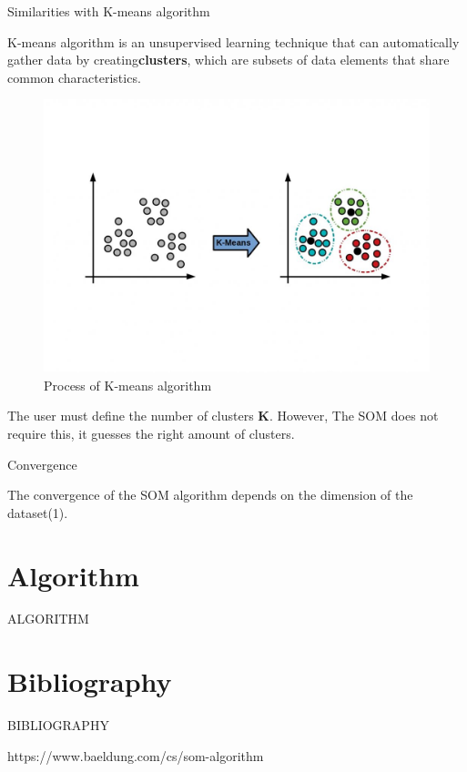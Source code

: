 \documentclass{beamer}
\begin{document}
	
	\begin{frame}{Similarities with K-means algorithm}
		
		K-means algorithm is an unsupervised learning technique that can automatically gather data by creating\textbf{clusters}, which are subsets of data elements that share common characteristics.

		\begin{center}
			
			\begin{figure}[h]
			
				\includegraphics[width=0.6\linewidth]{pics/kmeans.jpeg}
				\caption{Process of K-means algorithm}
			\end{figure}
		\end{center}
				
		The user must define the number of clusters \textbf{K}. However, The SOM does not require this, it guesses the right amount of clusters.

	\end{frame}

	
	\begin{frame}{Convergence}
		
		The convergence of the SOM algorithm depends on the dimension of the dataset(1).


	\end{frame}



\section{Algorithm}

	\begin{frame}
	
		\begin{center}
			
			\Huge ALGORITHM
		\end{center}
	\end{frame}










\section{Bibliography}
	
	\begin{frame}
	
		\begin{center}

			\Huge BIBLIOGRAPHY
		\end{center}
	\end{frame}


	\begin{frame}
	
https://www.baeldung.com/cs/som-algorithm
	\end{frame}
\end{document}
